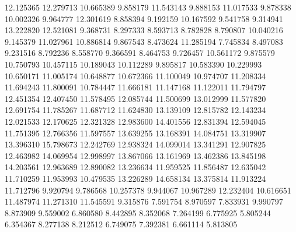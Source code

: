 12.125365
12.279713
10.665389
9.858179
11.543143
9.888153
11.017533
9.878338
10.002326
9.964777
12.301619
8.858394
9.192159
10.167592
9.541758
9.314941
13.222820
12.521081
9.368731
8.297333
8.593713
8.782828
8.790807
10.040216
9.145379
11.027961
10.886814
9.867543
8.473624
11.285194
7.745834
8.497083
9.231516
8.792236
8.558770
9.366591
8.464753
9.726457
10.561172
9.875579
10.750793
10.457115
10.189043
10.112289
9.895817
10.583390
10.229993
10.650171
11.005174
10.648877
10.672366
11.100049
10.974707
11.208334
11.694243
11.800091
10.784447
11.666181
11.147168
11.122011
11.794797
12.451354
12.407450
11.578495
12.085744
11.500699
13.012999
11.577820
12.691754
11.785267
11.687712
11.624830
13.139109
12.815782
12.143234
12.021533
12.170625
12.321328
12.983600
14.401556
12.831394
12.594045
11.751395
12.766356
11.597557
13.639255
13.168391
14.084751
13.319907
13.396310
15.798673
12.242769
12.938324
14.099014
13.341291
12.907825
12.463982
14.069954
12.998997
13.867066
13.161969
13.462386
13.845198
14.203561
12.963689
12.890082
13.236634
11.959525
11.856487
12.635042
11.710259
11.953993
10.479535
13.226289
14.658134
13.375814
11.913224
11.712796
9.920794
9.786568
10.257378
9.944067
10.967289
12.232404
10.616651
11.487974
11.271310
11.545591
9.315876
7.591754
8.970597
7.833931
9.990797
8.873909
9.559002
6.860580
8.442895
8.352068
7.264199
6.775925
5.805244
6.354367
8.277138
8.212512
6.749075
7.392381
6.661114
5.813805
